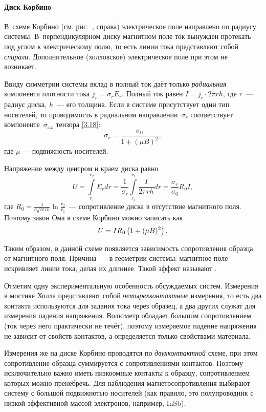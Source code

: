 \paragraph{Диск Корбино}
В~схеме Корбино (см. рис.~, справа) электрическое поле
направлено по радиусу системы. В~перпендикулярном диску магнитном поле ток
вынужден протекать под углом к электрическому полю, то есть линии тока
представляют собой \emph{спирали}. Дополнительное (холловское) электрическое
поле при этом не возникает.

Ввиду симметрии системы вклад в полный ток даёт только \emph{радиальная}
компонента плотности тока $j_r=\sigma_{r} E_r$. Полный ток равен
$I=j_r \cdot 2\pi r h$, где $r$~--- радиус диска, $h$~--- его толщина.
Если в системе присутствует один тип носителей, то проводимость в радиальном
направлении~$\sigma_r$ соответствует компоненте~$\sigma_{xx}$ тензора
\eqref{3.18}:
\begin{equation}
\sigma_r = \frac{\sigma_0}{1+(\mu B)^2},
\end{equation}
где $\mu$ --- подвижность носителей.

Напряжение между центром и краем диска равно
\begin{equation*}
U=\int\limits_{r_1}^{r_2}E_r dr=
\frac{1}{\sigma_r}\int\limits_{r_1}^{r_2} \frac{I}{2\pi r h}dr =
\frac{\sigma_r}{\sigma_0}R_0 I,
\end{equation*}
где $R_0 = \frac{1}{\sigma_0 2\pi r h} \ln \frac{r_2}{r_1}$~---
сопротивление диска в отсутствие магнитного поля. Поэтому закон Ома
в схеме Корбино можно записать как
\begin{equation}
    \eqmark{MagnetoSoprot}
    U=I R_0 \left(1+(\mu B)^2 \right).
\end{equation}

Таким образом, в данной схеме появляется зависимость сопротивления
образца от магнитного поля. Причина~--- в геометрии системы: 
магнитное поле искривляет линии тока, делая их длиннее. 
Такой эффект называют .

\begin{lab:note}
Отметим одну экспериментальную особенность обсуждаемых систем. Измерения 
в мостике Холла представляют собой \emph{четырехконтактные}
измерения, то есть два контакта используются для задания тока через образец, а 
два других служат для измерения падения напряжения. Вольтметр обладает
больш\'{и}м сопротивлением (ток через него практически не
течёт), поэтому измеряемое падение напряжения не зависит от свойств
контактов, а определяется только свойствами материала.

Измерения же на диске Корбино проводятся по \emph{двухконтактной}
схеме, при этом сопротивление образца суммируется с сопротивлениями
контактов. Поэтому исключительно важно иметь низкоомные контакты к образцу,
сопротивлением которых можно пренебречь. Для наблюдения магнетосопротивления 
выбирают систему с большой подвижнотью носителей (как правило, 
это полупроводник с низкой эффективной массой электронов, например, InSb).
\end{lab:note}


